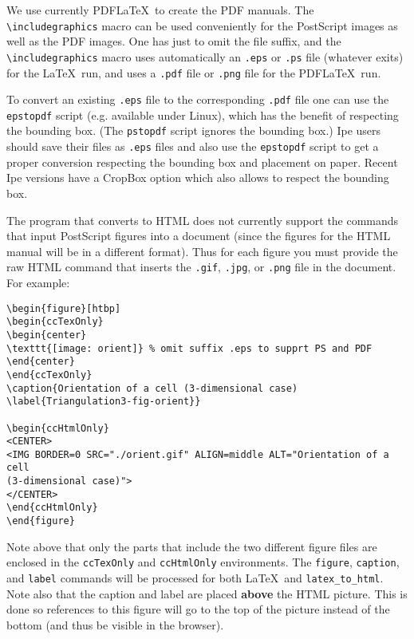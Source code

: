 We use currently PDF\LaTeX\ to create the PDF manuals. The
\verb|\includegraphics| macro can be used conveniently for the
PostScript images as well as the PDF images. One has just to omit the
file suffix, and the \verb|\includegraphics| macro uses automatically
an \texttt{.eps} or \texttt{.ps} file (whatever exits) for the \LaTeX\
run, and uses a \texttt{.pdf} file or \texttt{.png} file for the
PDF\LaTeX\ run.

To convert an existing \texttt{.eps} file to the corresponding
\texttt{.pdf} file one can use the
\texttt{epstopdf} script (e.g.
available under Linux), which has the benefit of respecting the
bounding box. (The \texttt{pstopdf}
script ignores the bounding box.)  Ipe\ccIndexMainItem{Ipe} users
should save their files as \texttt{.eps} files and also use the
\texttt{epstopdf} script to get a proper conversion respecting the
bounding box and placement on paper.  Recent Ipe versions have a
CropBox option which also allows to respect the bounding box.

The program that converts to HTML does not currently support
the commands that input PostScript figures into a document (since the figures
for the HTML manual will be in a different format).  Thus for each figure
you must provide the raw HTML command that inserts the {\tt .gif},
{\tt .jpg}, or {\tt .png} file in the
document.  For example:

\begin{verbatim}
\begin{figure}[htbp]
\begin{ccTexOnly}
\begin{center}
\texttt{[image: orient]} % omit suffix .eps to supprt PS and PDF
\end{center}
\end{ccTexOnly}
\caption{Orientation of a cell (3-dimensional case)
\label{Triangulation3-fig-orient}}

\begin{ccHtmlOnly}
<CENTER>
<IMG BORDER=0 SRC="./orient.gif" ALIGN=middle ALT="Orientation of a cell
(3-dimensional case)">
</CENTER>
\end{ccHtmlOnly}
\end{figure}
\end{verbatim}

Note above that only the parts that include the two different figure files
are enclosed in the {\tt ccTexOnly} and {\tt ccHtmlOnly} environments.
The {\tt figure}, {\tt caption}, and {\tt label} commands will be processed
for both \LaTeX\  and {\tt latex\_to\_html}.
Note also that the caption and label are placed {\bf above} the HTML picture.
This is done so references to this figure will go to the top of the picture
instead of the bottom (and thus be visible in the browser).


